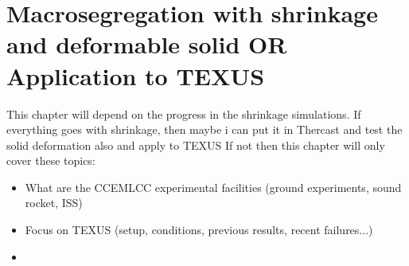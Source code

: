\chapter{Macrosegregation with shrinkage and deformable solid OR Application to TEXUS}
\minitoc
\newpage

This chapter will depend on the progress in the shrinkage simulations.
If everything goes with shrinkage, then maybe i can put it in Thercast and test the solid deformation also and apply to TEXUS
If not then this chapter will only cover these topics:
\begin{itemize}
\item What are the CCEMLCC experimental facilities (ground experiments, sound rocket, ISS)
\item Focus on TEXUS (setup, conditions, previous results, recent failures...)
\item 

\end{itemize}